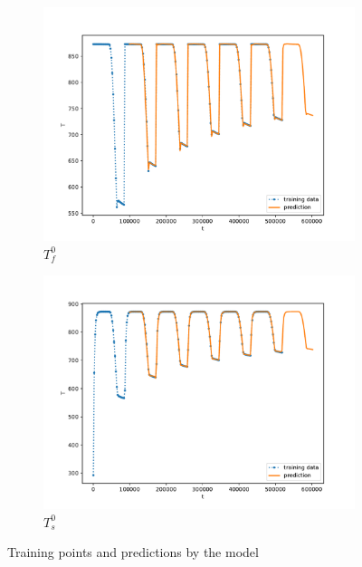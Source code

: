 \documentclass[a4paper]{article}
\begin{document}
\begin{figure}[t]
  \begin{subfigure}[b]{0.5\textwidth}
    \centering
    \includegraphics[width=\linewidth]{figures/task3/final_tf0.pdf}
    \caption{$T_f^0$}
    \label{fig:task3a}
  \end{subfigure}
  \begin{subfigure}[b]{0.5\textwidth}
    \centering
    \includegraphics[width=\linewidth]{figures/task3/final_ts0.pdf}
    \caption{$T_s^0$}
    \label{fig:task3b}
  \end{subfigure}
  \caption{Training points and predictions by the model}
  \label{fig:task3}
\end{figure}
\end{document}
